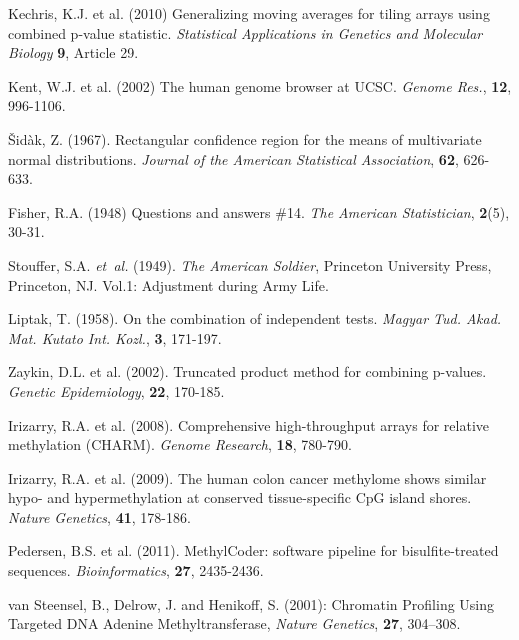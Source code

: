 \documentclass{bioinfo}
\begin{document}
\begin{thebibliography}{}
Kechris, K.J. et al. (2010)
Generalizing moving averages for tiling arrays using combined p-value
statistic. {\it Statistical Applications in Genetics and Molecular Biology}
{\bf 9}, Article 29.

 Kent, W.J. et al. (2002) The human genome browser at UCSC. {\it Genome Res.}, {\bf 12}, 996-1106.

Šidàk, Z. (1967).
Rectangular conﬁdence region for the means of multivariate normal distributions.
\textit{Journal of the American Statistical Association}, {\bf 62}, 626-633.

Fisher, R.A. (1948)
Questions and answers \#14.
{\it The American Statistician}, {\bf 2}(5), 30-31.

Stouffer, S.A. \textit{et~al.} (1949). \textit{The American Soldier},
Princeton University Press, Princeton, NJ. Vol.1: Adjustment during Army Life.

Liptak, T. (1958). On the combination of independent tests. {\it Magyar Tud.
Akad. Mat. Kutato Int. Kozl.}, {\bf 3}, 171-197.

 Zaykin, D.L. et al. (2002).
Truncated product method for combining p-values. {\it Genetic Epidemiology},
{\bf 22}, 170-185.

 Irizarry, R.A. et al.
(2008). Comprehensive high-throughput arrays for relative methylation (CHARM).
{\it Genome Research}, {\bf 18}, 780-790.

 Irizarry, R.A. et al.
(2009). The human colon cancer methylome shows similar hypo- and
hypermethylation at conserved tissue-specific CpG island shores.
{\it Nature Genetics}, {\bf 41}, 178-186.

 Pedersen, B.S. et al.
(2011). MethylCoder: software pipeline for bisulfite-treated sequences.
{\it Bioinformatics}, {\bf 27}, 2435-2436.

van Steensel, B., Delrow, J. and Henikoff, S. (2001): Chromatin Profiling Using Targeted DNA Adenine Methyltransferase,
{\it Nature Genetics}, {\bf 27}, 304–308.

\end{thebibliography}
\end{document}
